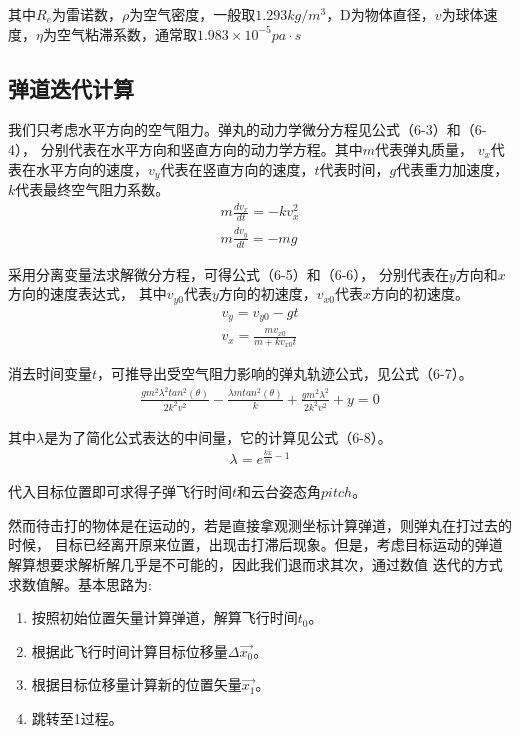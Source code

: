 其中$R_e$为雷诺数，$\rho$为空气密度，一般取$1.293kg/m^3$，D为物体直径，$v$为球体速度，$\eta$为空气粘滞系数，通常取$1.983\times10^{-5}pa\cdot s$


\subsection{弹道迭代计算}

我们只考虑水平方向的空气阻力。弹丸的动力学微分方程见公式（6-3）和（6-4），
分别代表在水平方向和竖直方向的动力学方程。其中$m$代表弹丸质量，
$v_x$代表在水平方向的速度，$v_y$代表在竖直方向的速度，$t$代表时间，$g$代表重力加速度，$k$代表最终空气阻力系数。
\begin{gather}
    m \frac{dv_x}{dt} = -k v_x^2 \\
    m \frac{dv_y}{dt} = -mg
\end{gather} 

采用分离变量法求解微分方程，可得公式（6-5）和（6-6），
分别代表在$y$方向和$x$方向的速度表达式，
其中$v_{y0}$代表$y$方向的初速度，$v_{x0}$代表$x$方向的初速度。
\begin{gather}
    v_y = v_{y0}-gt \\
    v_x = \frac{m v_{x0}}{m+kv_{x0}t}
\end{gather}

消去时间变量$t$，可推导出受空气阻力影响的弹丸轨迹公式，见公式（6-7）。
\begin{gather}
\frac{gm^2\lambda^2 tan^2(\theta)}{2k^2v^2}-\frac{\lambda m tan^2(\theta)}{k}+\frac{gm^2\lambda^2}{2k^2v^2}+y = 0
\end{gather}

其中$\lambda$是为了简化公式表达的中间量，它的计算见公式（6-8）。
\begin{gather}
    \lambda = e^{\frac{kx}{m}-1}
\end{gather}

代入目标位置即可求得子弹飞行时间$t$和云台姿态角$pitch$。\par
然而待击打的物体是在运动的，若是直接拿观测坐标计算弹道，则弹丸在打过去的时候，
目标已经离开原来位置，出现击打滞后现象。但是，考虑目标运动的弹道解算想要求解析解几乎是不可能的，因此我们退而求其次，通过数值
迭代的方式求数值解。基本思路为:
\begin{enumerate}
    \item 按照初始位置矢量计算弹道，解算飞行时间$t_0$。
    \item 根据此飞行时间计算目标位移量$\Delta \vec{x_0}$。
    \item 根据目标位移量计算新的位置矢量$\vec{x_1}$。
    \item 跳转至1过程。
\end{enumerate}


